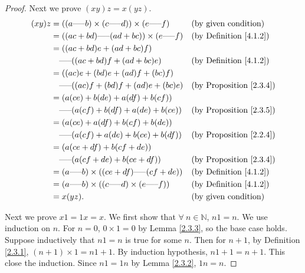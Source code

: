 \begin{proof}
Next we prove \((xy)z = x(yz)\).
\begin{align*}
(xy)z &= ((a \text{-----} b) \times (c \text{-----} d)) \times (e \text{-----} f) && \text{(by given condition)} \\
&= ((ac + bd) \text{-----} (ad + bc)) \times (e \text{-----} f) && \text{(by Definition \ref{4.1.2})} \\
&= ((ac + bd)e + (ad + bc)f) \\
&\quad \text{-----} ((ac + bd)f + (ad + bc)e) && \text{(by Definition \ref{4.1.2})} \\
&= ((ac)e + (bd)e + (ad)f + (bc)f) \\
&\quad \text{-----} ((ac)f + (bd)f + (ad)e + (bc)e) && \text{(by Proposition \ref{2.3.4})} \\
&= (a(ce) + b(de) + a(df) + b(cf)) \\
&\quad \text{-----} (a(cf) + b(df) + a(de) + b(ce)) && \text{(by Proposition \ref{2.3.5})} \\
&= (a(ce) + a(df) + b(cf) + b(de)) \\
&\quad \text{-----} (a(cf) + a(de) + b(ce) + b(df)) && \text{(by Proposition \ref{2.2.4})} \\
&= (a(ce + df) + b(cf + de)) \\
&\quad \text{-----} (a(cf + de) + b(ce + df)) && \text{(by Proposition \ref{2.3.4})} \\
&= (a \text{-----} b) \times ((ce + df) \text{-----} (cf + de)) && \text{(by Definition \ref{4.1.2})} \\
&= (a \text{-----} b) \times ((c \text{-----} d) \times (e \text{-----} f)) && \text{(by Definition \ref{4.1.2})} \\
&= x(yz). && \text{(by given condition)}
\end{align*}

Next we prove \(x1 = 1x = x\).
We first show that \(\forall\ n \in \mathds{N}\), \(n1 = n\).
We use induction on \(n\).
For \(n=0\), \(0 \times 1 = 0\) by Lemma \ref{2.3.3}, so the base case holds.
Suppose inductively that \(n1 = n\) is true for some \(n\).
Then for \(n + 1\), by Definition \ref{2.3.1}, \((n + 1) \times 1 = n1 + 1\).
By induction hypothesis, \(n1 + 1 = n + 1\).
This close the induction.
Since \(n1 = 1n\) by Lemma \ref{2.3.2}, \(1n = n\).


\end{proof}
